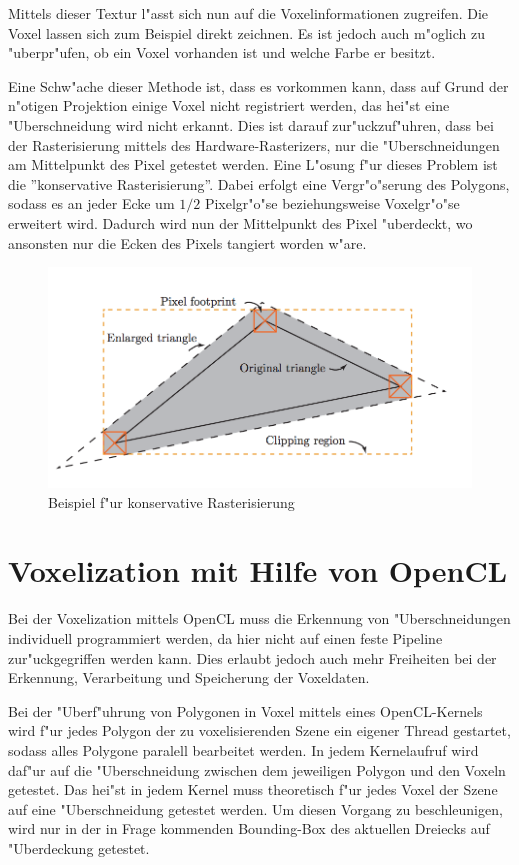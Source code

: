 \documentclass[a4paper, 12pt]{scrartcl}
\begin{document}
Mittels dieser Textur l"asst sich nun auf die Voxelinformationen zugreifen. Die Voxel lassen sich zum Beispiel direkt zeichnen. Es ist jedoch auch m"oglich zu "uberpr"ufen, ob ein Voxel vorhanden ist und welche Farbe er besitzt.

Eine Schw"ache dieser Methode ist, dass es vorkommen kann, dass auf Grund der n"otigen Projektion einige Voxel nicht registriert werden, das hei"st eine "Uberschneidung wird nicht erkannt. Dies ist darauf zur"uckzuf"uhren, dass bei der Rasterisierung mittels des Hardware-Rasterizers, nur die "Uberschneidungen am Mittelpunkt des Pixel getestet werden. 
Eine L"osung f"ur dieses Problem ist die ''konservative Rasterisierung''.
Dabei erfolgt eine Vergr"o"serung des Polygons, sodass es an jeder Ecke um $1/2$ Pixelgr"o"se beziehungsweise Voxelgr"o"se erweitert wird. Dadurch wird nun der Mittelpunkt des Pixel "uberdeckt, wo ansonsten nur die Ecken des Pixels tangiert worden w"are.

\begin{figure}[h]
	\centering
		\includegraphics[width=16cm]{conservative-rasterisation}
	\caption{Beispiel f"ur konservative Rasterisierung}
\end{figure}


\newpage

\section{Voxelization mit Hilfe von OpenCL}
Bei der Voxelization mittels OpenCL muss die Erkennung von "Uberschneidungen individuell programmiert werden, da hier nicht auf einen feste Pipeline zur"uckgegriffen werden kann. Dies erlaubt jedoch auch mehr Freiheiten bei der Erkennung, Verarbeitung und Speicherung der Voxeldaten. 

Bei der "Uberf"uhrung von Polygonen in Voxel mittels eines OpenCL-Kernels wird f"ur jedes Polygon der zu voxelisierenden Szene ein eigener Thread gestartet, sodass alles Polygone paralell bearbeitet werden. 
In jedem Kernelaufruf wird daf"ur auf die "Uberschneidung zwischen dem jeweiligen Polygon und den Voxeln getestet. 
Das hei"st in jedem Kernel muss theoretisch f"ur jedes Voxel der Szene auf eine "Uberschneidung getestet werden.
Um diesen Vorgang zu beschleunigen, wird nur in der in Frage kommenden Bounding-Box des aktuellen Dreiecks auf "Uberdeckung getestet.
\end{document}
